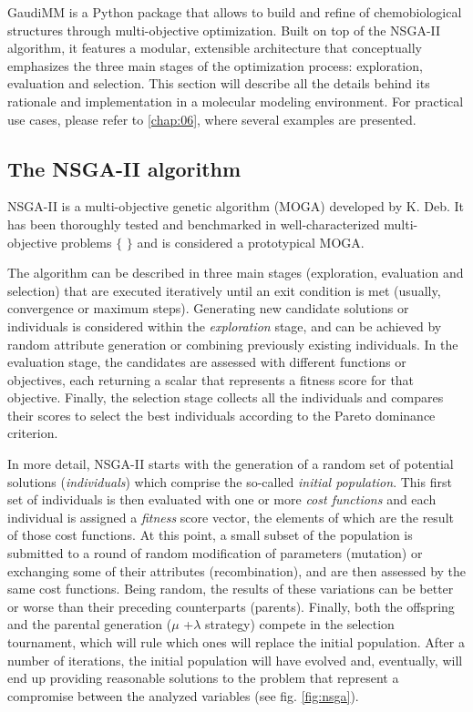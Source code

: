 


GaudiMM is a Python package that allows to build and refine of chemobiological structures through multi-objective optimization. Built on top of the NSGA-II algorithm, it features a modular, extensible architecture that conceptually emphasizes the three main stages of the optimization process: exploration, evaluation and selection. This section will describe all the details behind its rationale and implementation in a molecular modeling environment. For practical use cases, please refer to \autoref{chap:06}, where several examples are presented.

\subsection{The NSGA-II algorithm}
NSGA-II is a multi-objective genetic algorithm (MOGA) developed by K. Deb. It has been thoroughly tested and benchmarked in well-characterized multi-objective problems $ \{ $ $ \} $  and is considered a prototypical MOGA.

The algorithm can be described in three main stages (exploration, evaluation and selection) that are executed iteratively until an exit condition is met (usually, convergence or maximum steps). Generating new candidate solutions or individuals is considered within the \textit{exploration} stage, and can be achieved by random attribute generation or combining previously existing individuals. In the evaluation stage, the candidates are assessed with different functions or objectives, each returning a scalar that represents a fitness score for that objective. Finally, the selection stage collects all the individuals and compares their scores to select the best individuals according to the Pareto dominance criterion.

In more detail, NSGA-II starts with the generation of a random set of potential solutions (\textit{individuals}) which comprise the so-called \textit{initial population}. This first set of individuals is then evaluated with one or more \textit{cost functions} and each individual is assigned a \textit{fitness }score vector, the elements of which are the result of those cost functions. At this point, a small subset of the population is submitted to a round of random modification of parameters (mutation) or exchanging some of their attributes (recombination), and are then assessed by the same cost functions. Being random, the results of these variations can be better or worse than their preceding counterparts (parents). Finally, both the offspring and the parental generation ($ \mu $ +$ \lambda $  strategy) compete in the selection tournament, which will rule which ones will replace the initial population. After a number of iterations, the initial population will have evolved and, eventually, will end up providing reasonable solutions to the problem that represent a compromise between the analyzed variables (see fig. \ref{fig:nsga}).




